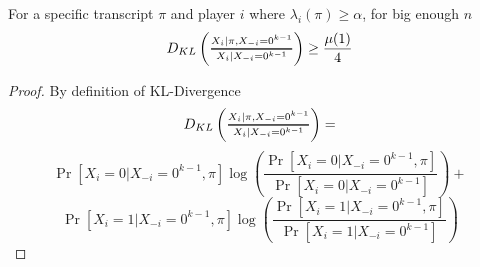 \begin{lemma}
    For a specific transcript $\pi$ and player $i$ where $\lambda_i(\pi) \geq \alpha$, for big enough $n$
    \begin{equation*}
        D_{KL}\left(\Dfrac{X_i | \pi, X_{-i} = 0^{k-1}}{X_i | X_{-i} = 0^{k-1}} \right) \geq \frac{\mu(1)}{4}
    \end{equation*}
\end{lemma}
\begin{proof}
By definition of KL-Divergence
\begin{equation*}
    D_{KL}\left(\Dfrac{X_i | \pi, X_{-i} = 0^{k-1}}{X_i | X_{-i} = 0^{k-1}} \right) = 
\end{equation*}
\begin{equation*}
    \Pr[X_i = 0 | X_{-i}=0^{k-1}, \pi]\log\left(\frac{\Pr[X_i = 0 | X_{-i}=0^{k-1}, \pi]}{\Pr[X_i = 0 | X_{-i}=0^{k-1}]}\right) +
\end{equation*}
\begin{equation*}
    \Pr[X_i = 1 | X_{-i}=0^{k-1}, \pi]\log\left(\frac{\Pr[X_i = 1 | X_{-i}=0^{k-1}, \pi]}{\Pr[X_i = 1 | X_{-i}=0^{k-1}]}\right)
\end{equation*}

\end{proof}

